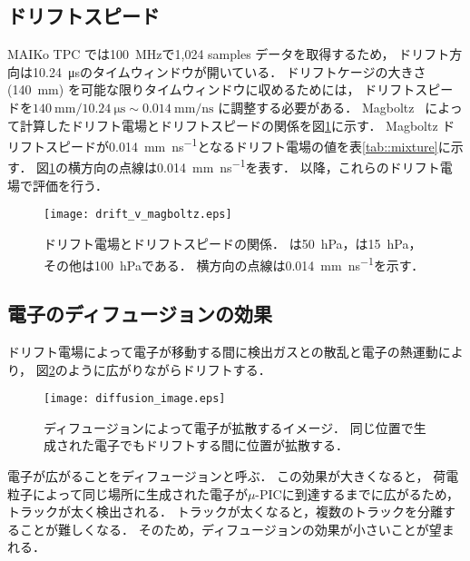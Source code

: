 \documentclass[../master]{subfiles}
\begin{document}
\subsection{ドリフトスピード}
MAIKo TPC では\SI{100}{\mega\hertz}で1,024 samples データを取得するため，
ドリフト方向は\SI{10.24}{\micro\second}のタイムウィンドウが開いている．
ドリフトケージの大きさ (\SI{140}{\milli\metre}) を可能な限りタイムウィンドウに収めるためには，
ドリフトスピードを$\SI{140}{\milli\metre}/\SI{10.24}{\micro\second} \sim \SI{0.014}{\milli\metre\per\nano\second}$
に調整する必要がある．
Magboltz~\cite{magboltz} によって計算したドリフト電場とドリフトスピードの関係を図\ref{fig::drift_v_magboltz}に示す．
Magboltz ドリフトスピードが\SI{0.014}{\milli\metre\per\nano\second}となるドリフト電場の値を表\ref{tab::mixture}に示す．
図\ref{fig::drift_v_magboltz}の横方向の点線は\SI{0.014}{\milli\metre\per\nano\second}を表す．
以降，これらのドリフト電場で評価を行う．
\begin{figure}
  \centering
  \texttt{[image: drift\_v\_magboltz.eps]}
  \caption[ドリフト電場とドリフトスピードの関係．]
          {ドリフト電場とドリフトスピードの関係．
            \Methane は\SI{50}{\hecto\pascal}，\isoButane は\SI{15}{\hecto\pascal}，その他は\SI{100}{\hecto\pascal}である．
            横方向の点線は\SI{0.014}{\milli\metre\per\nano\second}を示す．}
          \label{fig::drift_v_magboltz}
\end{figure}

\subsection{電子のディフュージョンの効果}
ドリフト電場によって電子が移動する間に検出ガスとの散乱と電子の熱運動により，
図\ref{fig::diffusion-image}のように広がりながらドリフトする．
\begin{figure}
  \centering
  \texttt{[image: diffusion\_image.eps]}
  \caption[ディフュージョンによって電子が拡散するイメージ．]
          {ディフュージョンによって電子が拡散するイメージ．
          同じ位置で生成された電子でもドリフトする間に位置が拡散する．}
  \label{fig::diffusion-image}
\end{figure}
電子が広がることをディフュージョンと呼ぶ．
この効果が大きくなると，
荷電粒子によって同じ場所に生成された電子が$\mu$-PICに到達するまでに広がるため，
トラックが太く検出される．
トラックが太くなると，複数のトラックを分離することが難しくなる．
そのため，ディフュージョンの効果が小さいことが望まれる．
\end{document}
